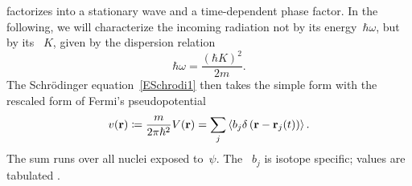 %
factorizes into a stationary wave and a time-dependent phase factor.
%
%
In the following, we will characterize the incoming radiation
not by its energy~$\hbar\omega$,
but by its ~$K$,
%
%
%
given by the dispersion relation
%
%
\begin{equation}
  \hbar\omega = \frac{(\hbar K)^2}{2m}.
\end{equation}
The Schrödinger equation~\cref{ESchrodi1} then takes the simple form
with the rescaled form of Fermi's pseudopotential
%
%
%
%
\begin{equation}\label{Evrraw}
  v(\mathbf{r})
  \coloneqq \frac{m}{2\pi\hbar^2} V(\mathbf{r})
  = \sum_j\left\langle b_j \delta\left(\mathbf{r}-\mathbf{r}_j(t)\right)\right\rangle.
\end{equation}
The sum runs over all nuclei exposed to~$\psi$.
The ~$b_j$
%
%
%
is isotope specific;
%
values are tabulated \cite{Sea92}.

